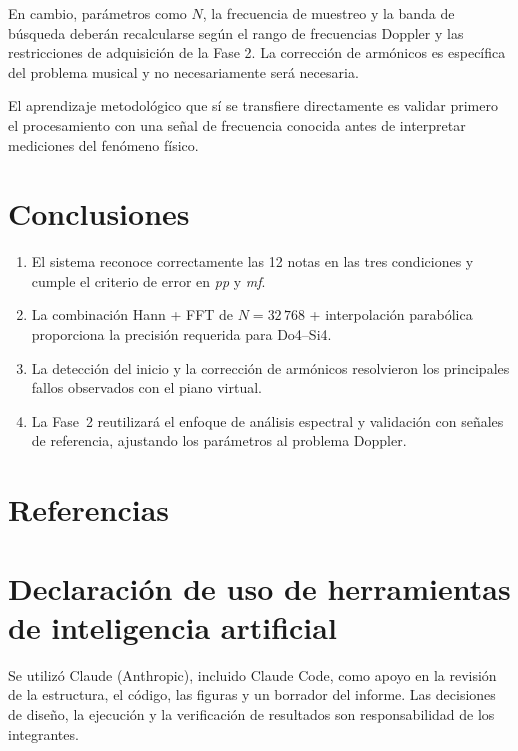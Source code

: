 \documentclass[12pt]{article}
\begin{document}
En cambio, parámetros como $N$, la frecuencia de muestreo y la banda de búsqueda
deberán recalcularse según el rango de frecuencias Doppler y las restricciones de
adquisición de la Fase 2. La corrección de armónicos es específica del problema
musical y no necesariamente será necesaria.

El aprendizaje metodológico que sí se transfiere directamente es validar primero el
procesamiento con una señal de frecuencia conocida antes de interpretar mediciones
del fenómeno físico.
\section{Conclusiones}
\begin{enumerate}
  \item El sistema reconoce correctamente las 12 notas en las tres condiciones y cumple
  el criterio de error en \emph{pp} y \emph{mf}.
  \item La combinación Hann + FFT de $N=32\,768$ + interpolación parabólica proporciona
  la precisión requerida para Do4--Si4.
  \item La detección del inicio y la corrección de armónicos resolvieron los principales
  fallos observados con el piano virtual.
  \item La Fase~2 reutilizará el enfoque de análisis espectral y validación con señales de
  referencia, ajustando los parámetros al problema Doppler.
\end{enumerate}

\section{Referencias}
\printbibliography[heading=none]

\section{Declaración de uso de herramientas de inteligencia artificial}
Se utilizó Claude (Anthropic), incluido Claude Code, como apoyo en la revisión de la
estructura, el código, las figuras y un borrador del informe. Las decisiones de diseño,
la ejecución y la verificación de resultados son responsabilidad de los integrantes.
\end{document}
